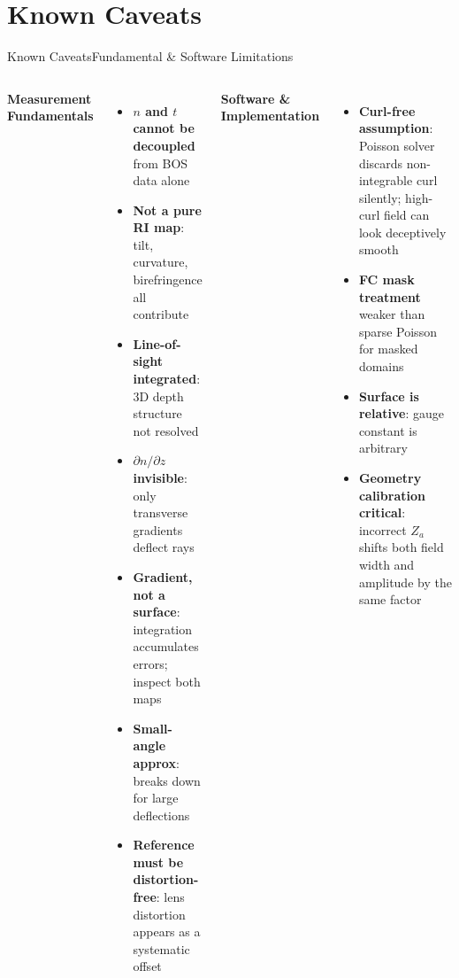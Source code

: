 \documentclass[9pt, aspectratio=169]{beamer}
\begin{document}
\section{Known Caveats}

\begin{frame}{Known Caveats}{Fundamental \& Software Limitations}
  \begin{columns}[t]
      \textbf{Measurement Fundamentals}
      \begin{itemize}
        \item \textbf{$n$ and $t$ cannot be decoupled} from BOS data alone
        \item \textbf{Not a pure RI map}: tilt, curvature, birefringence all contribute
        \item \textbf{Line-of-sight integrated}: 3D depth structure not resolved
        \item \textbf{$\partial n/\partial z$ invisible}: only transverse gradients deflect rays
        \item \textbf{Gradient, not a surface}: integration accumulates errors; inspect both maps
        \item \textbf{Small-angle approx}: breaks down for large deflections
        \item \textbf{Reference must be distortion-free}: lens distortion appears as a systematic offset
      \end{itemize}
      \textbf{Software \& Implementation}
      \begin{itemize}
        \item \textbf{Curl-free assumption}: Poisson solver discards non-integrable curl silently; high-curl field can look deceptively smooth
        \item \textbf{FC mask treatment} weaker than sparse Poisson for masked domains
        \item \textbf{Surface is relative}: gauge constant is arbitrary
        \item \textbf{Geometry calibration critical}: incorrect $Z_a$ shifts both field width and amplitude by the same factor
      \end{itemize}
  \end{columns}
\end{frame}
\end{document}
